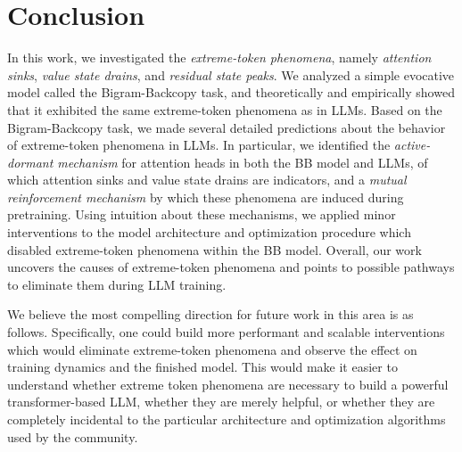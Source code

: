 \section{Conclusion} \label{sec:conclusion}

In this work, we investigated the \textit{extreme-token phenomena}, namely \textit{attention sinks}, \textit{value state drains}, and \textit{residual state peaks}. We analyzed a simple evocative model called the Bigram-Backcopy task, and theoretically and empirically showed that it exhibited the same extreme-token phenomena as in LLMs. Based on the Bigram-Backcopy task, we made several detailed predictions about the behavior of extreme-token phenomena in LLMs. In particular, we identified the \textit{active-dormant mechanism} for attention heads in both the BB model and LLMs, of which attention sinks and value state drains are indicators, and a \textit{mutual reinforcement mechanism} by which these phenomena are induced during pretraining. Using intuition about these mechanisms, we applied minor interventions to the model architecture and optimization procedure which disabled extreme-token phenomena within the BB model. Overall, our work uncovers the causes of extreme-token phenomena and points to possible pathways to eliminate them during LLM training.

We believe the most compelling direction for future work in this area is as follows. Specifically, one could build more performant and scalable interventions which would eliminate extreme-token phenomena and observe the effect on training dynamics and the finished model. This would make it easier to understand whether extreme token phenomena are necessary to build a powerful transformer-based LLM, whether they are merely helpful, or whether they are completely incidental to the particular architecture and optimization algorithms used by the community.